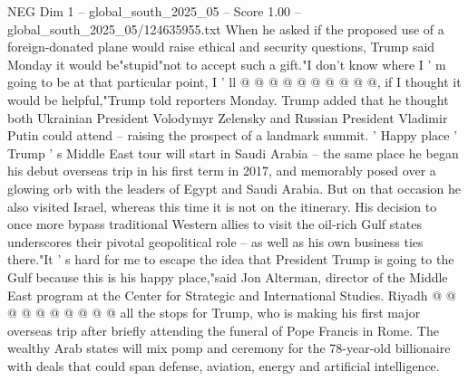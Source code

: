 \begin{textsample}{NEG Dim 1 – global\_south\_2025\_05 – Score 1.00 – global\_south\_2025\_05/124635955.txt}
When he asked if the proposed use of a foreign-donated plane would raise ethical and security questions, Trump said Monday it would be"stupid"not to accept such a gift."I don't know where I ' m going to be at that particular point, I ' ll @ @ @ @ @ @ @ @ @ @, if I thought it would be helpful,"Trump told reporters Monday.
Trump added that he thought both Ukrainian President Volodymyr Zelensky and Russian President Vladimir Putin could attend -- raising the prospect of a landmark summit. ' Happy place ' Trump ' s Middle East tour will start in Saudi Arabia -- the same place he began his debut overseas trip in his first term in 2017, and memorably posed over a glowing orb with the leaders of Egypt and Saudi Arabia.
But on that occasion he also visited Israel, whereas this time it is not on the itinerary.
His decision to once more bypass traditional Western allies to visit the oil-rich Gulf states underscores their pivotal geopolitical role -- as well as his own business ties there."It ' s hard for me to escape the idea that President Trump is going to the Gulf because this is his happy place,"said Jon Alterman, director of the Middle East program at the Center for Strategic and International Studies.
Riyadh @ @ @ @ @ @ @ @ @ @ all the stops for Trump, who is making his first major overseas trip after briefly attending the funeral of Pope Francis in Rome.
The wealthy Arab states will mix pomp and ceremony for the 78-year-old billionaire with deals that could span defense, aviation, energy and artificial intelligence.

\end{textsample}
